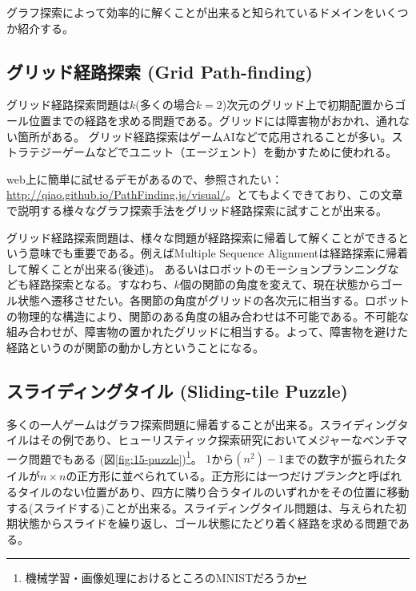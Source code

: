 \documentclass{report}
\begin{document}
グラフ探索によって効率的に解くことが出来ると知られているドメインをいくつか紹介する。


\subsection{グリッド経路探索 (Grid Path-finding)}

グリッド経路探索問題は$k$(多くの場合$k=2$)次元のグリッド上で初期配置からゴール位置までの経路を求める問題である。グリッドには障害物がおかれ、通れない箇所がある。
グリッド経路探索はゲームAIなどで応用されることが多い。ストラテジーゲームなどでユニット（エージェント）を動かすために使われる。

web上に簡単に試せるデモがあるので、参照されたい：\url{http://qiao.github.io/PathFinding.js/visual/}。とてもよくできており、この文章で説明する様々なグラフ探索手法をグリッド経路探索に試すことが出来る。

グリッド経路探索問題は、様々な問題が経路探索に帰着して解くことができるという意味でも重要である。例えばMultiple Sequence Alignmentは経路探索に帰着して解くことが出来る(後述)。
あるいはロボットのモーションプランニングなども経路探索となる。すなわち、$k$個の関節の角度を変えて、現在状態からゴール状態へ遷移させたい。各関節の角度がグリッドの各次元に相当する。ロボットの物理的な構造により、関節のある角度の組み合わせは不可能である。不可能な組み合わせが、障害物の置かれたグリッドに相当する。よって、障害物を避けた経路というのが関節の動かし方ということになる。



\subsection{スライディングタイル (Sliding-tile Puzzle)}

多くの一人ゲームはグラフ探索問題に帰着することが出来る。スライディングタイルはその例であり、ヒューリスティック探索研究においてメジャーなベンチマーク問題でもある (図\ref{fig:15-puzzle})\footnote{機械学習・画像処理におけるところのMNISTだろうか}。
$1$から$(n^2)-1$までの数字が振られたタイルが$n\times n$の正方形に並べられている。正方形には一つだけ{\it ブランク}と呼ばれるタイルのない位置があり、四方に隣り合うタイルのいずれかをその位置に移動する(スライドする)ことが出来る。スライディングタイル問題は、与えられた初期状態からスライドを繰り返し、ゴール状態にたどり着く経路を求める問題である。
\end{document}
